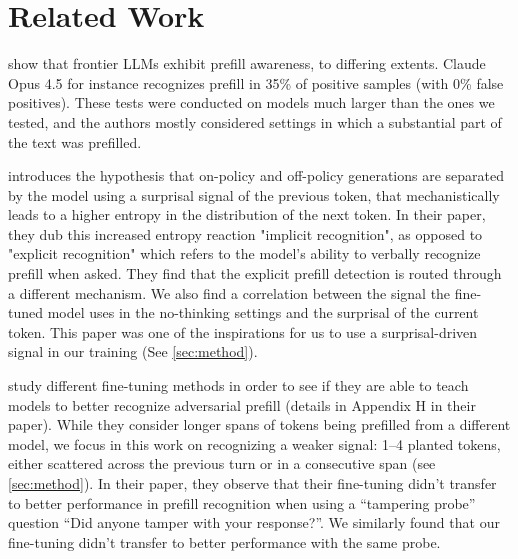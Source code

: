 \section{Related Work}
\label{sec:related}

\citet{wang2026prefillawareness} show that frontier LLMs exhibit prefill awareness, to differing extents. Claude Opus 4.5 for instance recognizes prefill in 35\% of positive samples (with 0\% false positives). These tests were conducted on models much larger than the ones we tested, and the authors mostly considered settings in which a substantial part of the text was prefilled.

\citet{g2026enaction} introduces the hypothesis that on-policy and off-policy generations are separated by the model using a surprisal signal of the previous token, that mechanistically leads to a higher entropy in the distribution of the next token. In their paper, they dub this increased entropy reaction "implicit recognition", as opposed to "explicit recognition" which refers to the model's ability to verbally recognize prefill when asked. They find that the explicit prefill detection is routed through a different mechanism. We also find a correlation between the signal the fine-tuned model uses in the no-thinking settings and the surprisal of the current token. This paper was one of the inspirations for us to use a surprisal-driven signal in our training (See \ref{sec:method}).

\citet{nguyen2026selfreport} study different fine-tuning methods in order to see if they are able to teach models to better recognize adversarial prefill (details in Appendix H in their paper). While they consider longer spans of tokens being prefilled from a different model, we focus in this work on recognizing a weaker signal: 1--4 planted tokens, either scattered across the previous turn or in a consecutive span (see \ref{sec:method}). In their paper, they observe that their fine-tuning didn't transfer to better performance in prefill recognition when using a ``tampering probe'' question ``Did anyone tamper with your response?''. We similarly found that our fine-tuning didn't transfer to better performance with the same probe.